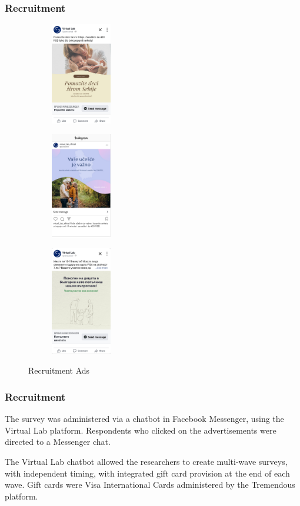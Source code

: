 \documentclass[aspectratio=169]{beamer}
\begin{document}
\begin{frame}
  \frametitle{Recruitment}



\begin{figure}[H]
\centering
\begin{subfigure}{0.3\textwidth}
\centering
\includegraphics[width=100px]{../images/recruitment/558.png}
\end{subfigure}
\begin{subfigure}{0.3\textwidth}
\centering
\includegraphics[width=100px]{../images/recruitment/639.png}
\end{subfigure}
\begin{subfigure}{0.3\textwidth}
\centering
\includegraphics[width=100px]{../images/recruitment/742.png}
\end{subfigure}
\caption{Recruitment Ads}
\label{fig:Recruitment Ads}
\end{figure}

\end{frame}


\begin{frame}
  \frametitle{Recruitment}

The survey was administered via a chatbot in Facebook Messenger, using the Virtual Lab platform. Respondents who clicked on the advertisements were directed to a Messenger chat. 

The Virtual Lab chatbot allowed the researchers to create multi-wave surveys, with independent timing, with integrated gift card provision at the end of each wave. Gift cards were Visa International Cards administered by the Tremendous platform.

\end{frame}
\end{document}
